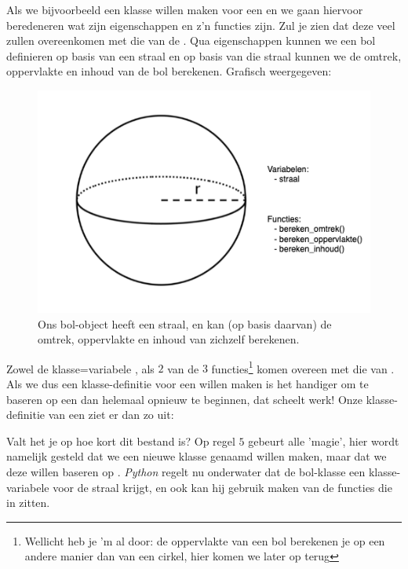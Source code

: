 Als we bijvoorbeeld een klasse willen maken voor een  en we gaan hiervoor beredeneren wat zijn eigenschappen en z'n functies zijn. Zul je zien dat deze veel zullen overeenkomen met die van de . Qua eigenschappen kunnen we een bol definieren op basis van een straal en op basis van die straal kunnen we de omtrek, oppervlakte en inhoud van de bol berekenen. Grafisch weergegeven:
\begin{figure}[h!]
\centering\includegraphics[scale=0.7]{Pictures/chapter08/bol.png}
\caption{Ons bol-object heeft een straal, en kan (op basis daarvan) de omtrek, oppervlakte en inhoud van zichzelf berekenen.}
\label{fig:bol} %
\end{figure}

Zowel de klasse=variabele , als $2$ van de $3$ functies\footnote{Wellicht heb je 'm al door: de oppervlakte van een bol berekenen je op een andere manier dan van een cirkel, hier komen we later op terug} komen overeen met die van . Als we dus een klasse-definitie voor een  willen maken is het handiger om te baseren op een  dan helemaal opnieuw te beginnen, dat scheelt werk! Onze klasse-definitie van een  ziet er dan zo uit:


Valt het je op hoe kort dit bestand is? Op regel $5$ gebeurt alle 'magie', hier wordt namelijk gesteld dat we een nieuwe klasse genaamd  willen maken, maar dat we deze willen baseren op . \textit{Python} regelt nu onderwater dat de bol-klasse een klasse-variabele  voor de straal krijgt, en ook kan hij gebruik maken van de functies die in  zitten. \newline

